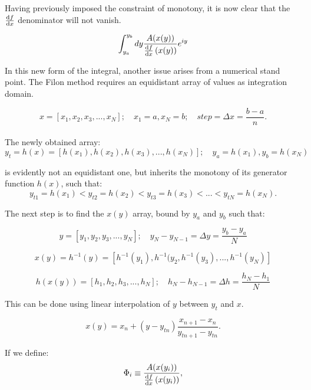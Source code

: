 Having previously imposed the constraint of monotony, it is now clear that the $\dv{f}{x}$ denominator will not vanish.

\begin{equation}
    \int_{y_a}^{y_b}dy\frac{A(x(y))}{\dv{f}{x}\left(x(y)\right)}e^{iy}
\end{equation}


In this new form of the integral, another issue arises from a numerical stand point. 
The Filon method requires an equidistant array of values as integration domain.

\begin{equation}
    x = [x_1, x_2, x_3, ..., x_N]; \quad x_1 = a, x_N = b; \quad step = \Delta x = \frac{b-a}{n}. 
\end{equation}\\

The newly obtained array: 
\begin{equation}
    y_t=h(x)=[h(x_1),h(x_2),h(x_3), ..., h(x_N)]; \quad y_a=h(x_1), y_b=h(x_N) 
\end{equation}

is evidently not an equidistant one, but inherits the monotony of its generator function $h(x)$, such that:
$$
    y_{t1}=h(x_1) < y_{t2}=h(x_2) < y_{t3}=h(x_3) < ... < y_{tN}=h(x_N).
$$

The next step is to find the $x(y)$ array, bound by $y_a$ and $y_b$ such that:

\begin{equation}
        y = [y_1, y_2, y_3, ..., y_N]; \quad y_N-y_{N-1}=\Delta y = \frac{y_b-y_a}{N} 
\end{equation}

\begin{equation}
    x(y)=h^{-1}(y)=[h^{-1}(y_1), h^{-1}(y_2, h^{-1}(y_3), ...,h^{-1}(y_N)] 
\end{equation}

\begin{equation}
    h(x(y)) = [h_1,h_2,h_3, ..., h_N];\quad h_N-h_{N-1}=\Delta h = \frac{h_N-h_1}{N} 
\end{equation}

This can be done using linear interpolation of $y$ between $y_t$ and $x$.

\begin{equation}
    x(y)=x_n+(y-y_{tn})\frac{x_{n+1}-x_n}{y_{tn+1}-y_{tn}}.\label{linearInterpol}
\end{equation}

If we define:
\begin{equation}
    \Phi_i \equiv \frac{A(x(y_i))}{\dv{f}{x}\left(x(y_i)\right)},\label{changedPhi}
\end{equation}

